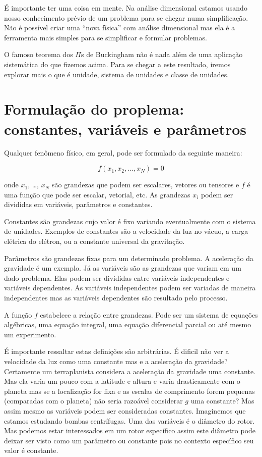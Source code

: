 É importante ter uma coisa em mente. Na análise dimensional estamos usando nosso conhecimento prévio de um problema para se chegar numa simplificação. Não é possível criar uma ``nova física'' com análise dimensional mas ela é a ferramenta mais simples para se simplificar e formular problemas.

O famoso teorema dos $\Pi$s de Buckingham não é nada além de uma aplicação sistemática do que fizemos acima. Para se chegar a este resultado, iremos explorar mais o que é unidade, sistema de unidades e classe de unidades.

\section{Formulação do proplema: constantes, variáveis e parâmetros}

Qualquer fenômeno físico, em geral,  pode ser formulado da seguinte maneira:

\[
f\left(x_1, x_2, \ldots, x_N\right) = 0
\]

onde $x_1$, \ldots, $x_N$ são grandezas que podem ser escalares, vetores ou tensores e $f$ é uma função que pode ser escalar, vetorial, etc. As grandezas $x_i$ podem ser divididas em variáveis, parâmetros e constantes.

Constantes são grandezas cujo valor é fixo variando eventualmente com o sistema de unidades. Exemplos de constantes são a velocidade da luz no vácuo, a carga elétrica do elétron, ou a constante universal da gravitação.

Parâmetros são grandezas fixas para um determinado problema. A aceleração da gravidade é um exemplo. Já as variáveis são as grandezas que variam em um dado problema. Elas podem ser divididas entre variáveis independentes e variáveis dependentes. As variáveis independentes podem ser variadas de maneira independentes mas as variáveis dependentes são resultado pelo processo.

A função $f$ estabelece a relação entre grandezas. Pode ser um sistema de equações algébricas, uma equação integral, uma equação diferencial parcial ou até mesmo um experimento.

É importante ressaltar estas definições são arbitrárias. É dificil não ver a velocidade da luz como uma constante mas e a aceleração da gravidade? Certamente um terraplanista considera a aceleração da gravidade uma constante. Mas ela varia um pouco com a latitude e altura e varia drasticamente com o planeta mas se a localização for fixa e as escalas de comprimento forem pequenas (comparadas com o planeta) não seria razoável considerar $g$ uma constante? Mas assim mesmo as variáveis podem ser consideradas constantes. Imaginemos que estamos estudando bombas centrífugas. Uma das variáveis é o diâmetro do rotor. Mas podemos estar interessados em um rotor específico assim este diâmetro pode deixar ser visto como um parâmetro ou constante pois no contexto específico seu valor é constante.

